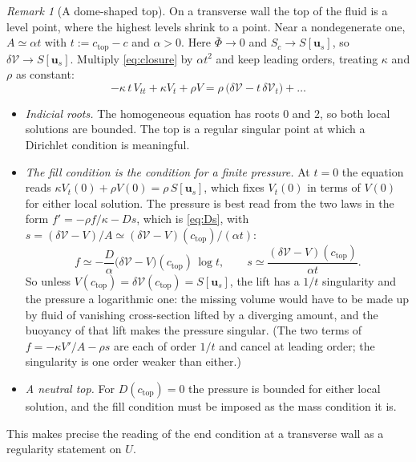 \documentclass[11pt]{article}
\theoremstyle{definition}
\theoremstyle{remark}
\newtheorem{remark}{Remark}
\newcommand{\bu}{\mathbf{u}}
\newcommand{\Vol}{\mathcal V}
\begin{document}
\begin{remark}[A dome-shaped top]
\label{rem:dome}
On a transverse wall the top of the fluid is a level point, where the
highest levels shrink to a point. Near a nondegenerate one, $A \simeq
\alpha t$ with $t := c_{\mathrm{top}} - c$ and $\alpha > 0$. Here
$\bar\Phi \to 0$ and $S_c \to S[\bu_s]$, so $\delta\Vol \to S[\bu_s]$.
Multiply \eqref{eq:closure} by $\alpha t^2$ and keep leading orders,
treating $\kappa$ and $\rho$ as constant:
\begin{equation*}
  -\kappa\,t\,V_{tt} + \kappa V_t + \rho V
  = \rho\,\bigl(\delta\Vol - t\,\delta\Vol_t\bigr) + \dots
\end{equation*}
\begin{itemize}
\item \emph{Indicial roots.} The homogeneous equation has roots $0$ and
  $2$, so both local solutions are bounded. The top is a regular
  singular point at which a Dirichlet condition is meaningful.
\item \emph{The fill condition is the condition for a finite
  pressure.} At $t = 0$ the equation reads $\kappa V_t(0) + \rho V(0) =
  \rho\,S[\bu_s]$, which fixes $V_t(0)$ in terms of $V(0)$ for either
  local solution. The pressure is best read from the two laws in the
  form $f' = -\rho f/\kappa - Ds$, which is \eqref{eq:Ds}, with $s =
  (\delta\Vol - V)/A \simeq (\delta\Vol - V)(c_{\mathrm{top}})/(\alpha
  t)$:
  \begin{equation*}
    f \simeq -\frac{D}{\alpha}\bigl(\delta\Vol - V\bigr)(c_{\mathrm{top}})\,\log t ,
    \qquad
    s \simeq \frac{(\delta\Vol - V)(c_{\mathrm{top}})}{\alpha t} .
  \end{equation*}
  So unless $V(c_{\mathrm{top}}) = \delta\Vol(c_{\mathrm{top}}) =
  S[\bu_s]$, the lift has a $1/t$ singularity and the pressure a
  logarithmic one: the missing volume would have to be made up by fluid
  of vanishing cross-section lifted by a diverging amount, and the
  buoyancy of that lift makes the pressure singular. (The two terms of
  $f = -\kappa V'/A - \rho s$ are each of order $1/t$ and cancel at
  leading order; the singularity is one order weaker than either.)
\item \emph{A neutral top.} For $D(c_{\mathrm{top}}) = 0$ the pressure is
  bounded for either local solution, and the fill condition must be
  imposed as the mass condition it is.
\end{itemize}
This makes precise the reading of the end condition at a transverse
wall as a regularity statement on $U$.
\end{remark}
\end{document}
